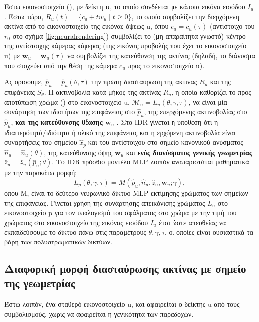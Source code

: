 \par 
    Έστω εικονοστοιχείο (), με δείκτη \textbf{u}, το οποίο συνδέεται με κάποια εικόνα εισόδου $I_u$. Έστω τώρα, $R_{u}(t)= \{ c_u+tw_u \mid t \geq 0\}$, το οποίο συμβολίζει την διερχόμενη ακτίνα από το εικονοστοιχείο της εικόνας όψεως u, όπου $c_u = c_u(\tau)$ (αντίστοιχο του $r_0$ στο σχήμα \ref{fig:neuralrendering}) συμβολίζει το (μη απαραίτητα γνωστό) κέντρο της αντίστοιχης κάμερας κάμερας (της εικόνας προβολής που έχει το εικονοστοιχείο u) με $\boldsymbol{w}_u = \boldsymbol{w}_u(\tau)$ να συμβολίζει της κατεύθυνση της ακτίνας (δηλαδή, το διάνυσμα που στοχεύει από την θέση της κάμερα $c_u$ προς το εικονοστοιχείο u).
\par
    Ας ορίσουμε, $\hat{p}_u = \hat{p}_u(\theta, \tau)$   την πρώτη διασταύρωση της ακτίνας $R_u$ και της επιφάνειας $S_\theta$. Η ακτινοβολία κατά μήκος της ακτίνας $R_u$, η οποία καθορίζει το προς αποτύπωση χρώμα () στο εικονοστοιχείο u, $ \mathcal{M}_{u} = L_u(\theta, \gamma, \tau)$, να είναι μία συνάρτηση των ιδιοτήτων της επιφάνειας στο $\hat{p}_u$, της επερχόμενης ακτινοβολίας στο $\hat{p}_u$, \textbf{και της κατεύθυνσης θέασης $\boldsymbol{w}_u$} . Στο IDR γίνεται η υπόθεση ότι η ιδιαιτερότητά/ιδιότητα ή υλικό της επιφάνειας και η ερχόμενη ακτινοβολία είναι συναρτήσεις του σημείου  $\hat{x}_p$   και του αντίστοιχου στο σημείο κανονικού ανύσματος $\hat{n}_u=\hat{n}_u(\theta)$, της κατεύθυνσης όψης $\boldsymbol{w}_u$ και \textbf{ενός διανύσματος γενικής γεωμετρίας} $\hat{z}_u=\hat{z}_u(\hat{p}_u;\theta)$. Το IDR πρόσθιο μοντέλο MLP λοιπόν αναπαριστάται μαθηματικά με την παρακάτω μορφή:
    \begin{equation}
        L_p(\theta, \gamma, \tau) = M(\hat{p}_u, \hat{n}_u, \hat{z}_u, \boldsymbol{w}_u;\gamma),         \label{eq:IDRForwardModel}
    \end{equation} όπου Μ, είναι το δεύτερο νευρωνικό δίκτυο MLP εκτίμησης χρώματος των σημείων της επιφάνειας. Γίνεται χρήση της συνάρτησης απεικόνισης χρώματος $L_u$ στο εικονοστοιχείο p για τον υπολογισμό του σφάλματος στο χρώμα με την τιμή του χρώματος στο εικονοστοιχείο της εικόνας εισόδου $I_u$ έτσι ώστε απευθείας να εκπαιδεύσουμε το δίκτυο πάνω στις παραμέτρους $\theta, \gamma, \tau$, οι οποίες είναι ουσιαστικά τα βάρη των πολυστρωματικών δικτύων.

    
\subsection{Διαφορική μορφή διασταύρωσης ακτίνας με σημείο της γεωμετρίας}
\par 
    Έστω λοιπόν, ένα σταθερό εικονοστοιχείο u, και αφαιρείται ο δείκτης u από τους συμβολισμούς, χωρίς να αφαιρείται η γενικότητα των παραδοχών.

